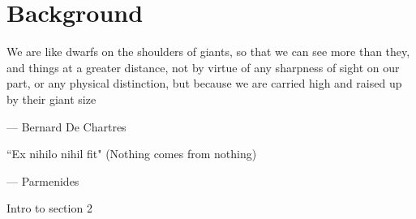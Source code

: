 \chapter{Background}
\label{sec:sec2}

\epigraph{We are like dwarfs on the shoulders of giants, so that we can see more than they, and things at a greater distance, not by virtue of any sharpness of sight on our part, or any physical distinction, but because we are carried high and raised up by their giant size}{--- \textup{Bernard De Chartres}}

\epigraph{``Ex nihilo nihil fit" (Nothing comes from nothing)}{--- \textup{Parmenides}}

Intro to section 2

